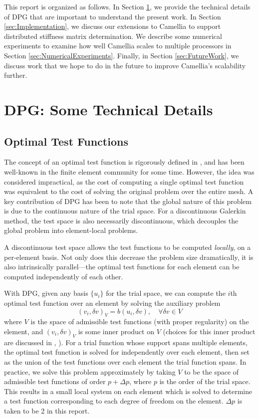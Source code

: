 \documentclass{article}
\begin{document}
This report is organized as follows.  In Section \ref{sec:DPGIntro}, we provide the technical details of DPG that are important to understand the present work.  In Section \ref{sec:Implementation}, we discuss our extensions to Camellia to support distributed stiffness matrix determination.  We describe some numerical experiments to examine how well Camellia scales to multiple processors in Section \ref{sec:NumericalExperiments}.  Finally, in Section \ref{sec:FutureWork}, we discuss work that we hope to do in the future to improve Camellia's scalability further.

\section{DPG: Some Technical Details}\label{sec:DPGIntro}
\subsection{Optimal Test Functions}

The concept of an optimal test function is rigorously defined in \cite{DPG2}, and has been well-known in the finite element community for some time. However, the idea was considered impractical, as the cost of computing a single optimal test function was equivalent to the cost of solving the original problem over the entire mesh. A key contribution of DPG has been to note that the global nature of this problem is due to the continuous nature of the trial space. For a discontinuous Galerkin method, the test space is also necessarily discontinuous, which decouples the global problem into element-local problems. 

A discontinuous test space allows the test functions to be computed \emph{locally}, on a per-element basis. Not only does this decrease the problem size dramatically, it is also intrinsically parallel---the optimal test functions for each element can be computed independently of each other. 

With DPG, given any basis $\{u_i\}$ for the trial space, we can compute the $i$th optimal test function over an element by solving the auxiliary problem 
\[
(v_i, \delta v)_V = b(u_i,\delta v), \quad \forall \delta v\in V
\]
where $V$ is the space of admissible test functions (with proper regularity) on the element, and $(v_i,\delta v)_V$ is some inner product on $V$ (choices for this inner product are discussed in \cite{DPG2}, \cite{DPG4}). For a trial function whose support spans multiple elements, the optimal test function is solved for independently over each element, then set as the union of the test functions over each element the trial function spans. In practice, we solve this problem approximately by taking $V$ to be the space of admissible test functions of order $p+\Delta p$, where $p$ is the order of the trial space. This results in a small local system on each element which is solved to determine a test function corresponding to each degree of freedom on the element. $\Delta p$ is taken to be 2 in this report. 
\end{document}
